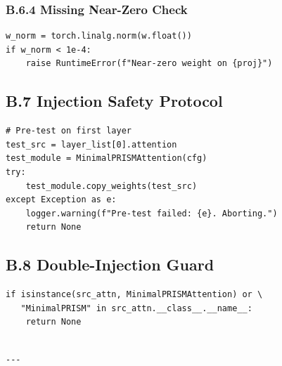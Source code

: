 \subsubsection{B.6.4 Missing Near-Zero Check}

\begin{lstlisting}
w_norm = torch.linalg.norm(w.float())
if w_norm < 1e-4:
    raise RuntimeError(f"Near-zero weight on {proj}")
\end{lstlisting}

\subsection{B.7 Injection Safety Protocol}

\begin{lstlisting}
# Pre-test on first layer
test_src = layer_list[0].attention
test_module = MinimalPRISMAttention(cfg)
try:
    test_module.copy_weights(test_src)
except Exception as e:
    logger.warning(f"Pre-test failed: {e}. Aborting.")
    return None
\end{lstlisting}

\subsection{B.8 Double-Injection Guard}

\begin{lstlisting}
if isinstance(src_attn, MinimalPRISMAttention) or \
   "MinimalPRISM" in src_attn.__class__.__name__:
    return None
\end{lstlisting}
\begin{lstlisting}

---
\end{lstlisting}